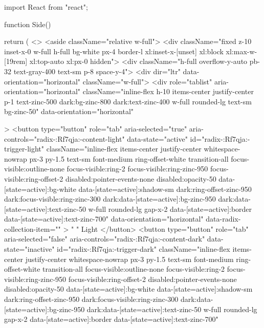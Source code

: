 import React from "react";

  function Side() {
  return (
    <>
      <aside className="relative w-full">
        <div className="fixed z-10 inset-x-0 w-full h-full bg-white px-4 border-l xl:inset-x-[unset] xl:block xl:max-w-[19rem] xl:top-auto xl:px-0 hidden">
          <div className="h-full overflow-y-auto pb-32 text-gray-400 text-sm p-8 space-y-4">
            <div dir="ltr" data-orientation="horizontal" className="w-full">
              <div
                role="tablist"
                aria-orientation="horizontal"
                className="inline-flex h-10 items-center justify-center p-1 text-zinc-500 dark:bg-zinc-800 dark:text-zinc-400 w-full rounded-lg text-sm bg-zinc-50"
                data-orientation="horizontal"
               
              >
                <button
                  type="button"
                  role="tab"
                  aria-selected="true"
                  aria-controls="radix-:Rf7qja:-content-light"
                  data-state="active"
                  id="radix-:Rf7qja:-trigger-light"
                  className="inline-flex items-center justify-center whitespace-nowrap px-3 py-1.5 text-sm font-medium ring-offset-white transition-all focus-visible:outline-none focus-visible:ring-2 focus-visible:ring-zinc-950 focus-visible:ring-offset-2 disabled:pointer-events-none disabled:opacity-50 data-[state=active]:bg-white data-[state=active]:shadow-sm dark:ring-offset-zinc-950 dark:focus-visible:ring-zinc-300 dark:data-[state=active]:bg-zinc-950 dark:data-[state=active]:text-zinc-50 w-full rounded-lg gap-x-2 data-[state=active]:border data-[state=active]:text-zinc-700"
                  data-orientation="horizontal"
                  data-radix-collection-item=""
                >
                  {" "}
                  Light
                </button>
                <button
                  type="button"
                  role="tab"
                  aria-selected="false"
                  aria-controls="radix-:Rf7qja:-content-dark"
                  data-state="inactive"
                  id="radix-:Rf7qja:-trigger-dark"
                  className="inline-flex items-center justify-center whitespace-nowrap px-3 py-1.5 text-sm font-medium ring-offset-white transition-all focus-visible:outline-none focus-visible:ring-2 focus-visible:ring-zinc-950 focus-visible:ring-offset-2 disabled:pointer-events-none disabled:opacity-50 data-[state=active]:bg-white data-[state=active]:shadow-sm dark:ring-offset-zinc-950 dark:focus-visible:ring-zinc-300 dark:data-[state=active]:bg-zinc-950 dark:data-[state=active]:text-zinc-50 w-full rounded-lg gap-x-2 data-[state=active]:border data-[state=active]:text-zinc-700"
}
